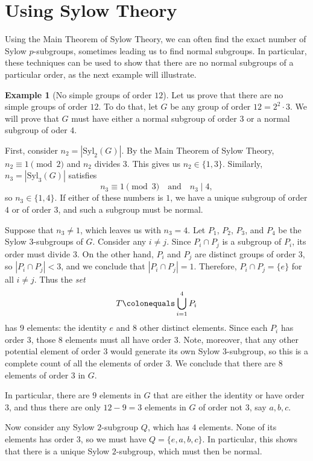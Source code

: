 \documentclass[12pt]{report}
\numberwithin{equation}{section}
\numberwithin{theorem}{chapter}
\theoremstyle{definition}
\newtheorem{example}[theorem]{Example}
\newtheorem*{basic properties}{Basic Properties}
\newtheorem*{Important Remark}{Important Remark}
\begin{document}
\section{Using Sylow Theory}


Using the Main Theorem of Sylow Theory, we can often find the exact number of Sylow $p$-subgroups, sometimes leading us to find normal subgroups. In particular, these techniques can be used to show that there are no normal subgroups of a particular order, as the next example will illustrate.


\begin{example}[No simple groups of order $12$]\label{example sylow 12}
Let us prove that there are no simple groups of order $12$. To do that, let $G$ be any group of order $12 = 2^2 \cdot 3$. We will prove that $G$ must have either a normal subgroup of order $3$ or a normal subgroup of oder $4$.


First, consider $n_2=|\mathrm{Syl}_2(G)|$. By the Main Theorem of Sylow Theory, $n_2 \equiv 1 \!\pmod 2$ and $n_2$ divides $3$. This gives us $n_2 \in \{ 1, 3 \}$. Similarly, $n_3 = |\mathrm{Syl}_3(G)|$ satisfies
$$n_3 \equiv 1 \!\!\pmod 3 \quad \textrm{and} \quad n_3 \mid 4,$$
so $n_3 \in \{1, 4 \}$.
If either of these numbers is $1$, we have a unique subgroup of order $4$ or of order $3$, and such a subgroup must be normal. 

Suppose that $n_3 \neq 1$, which leaves us with $n_3 = 4$. Let $P_1$, $P_2$, $P_3$, and $P_4$ be the Sylow $3$-subgroups of $G$. Consider any $i \neq j$. Since $P_i \cap P_j$ is a subgroup of $P_i$, its order must divide $3$. On the other hand, $P_i$ and $P_j$ are distinct groups of order $3$, so $|P_i \cap P_j| < 3$, and we conclude that  $|P_i \cap P_j| = 1$. Therefore, $P_i \cap P_j = \{e\}$ for all $i \neq j$. Thus the {\em set} 
$$T \colonequals \bigcup_{i=1}^4 P_i$$ 
has $9$ elements: the identity $e$ and $8$ other distinct elements. Since each $P_i$ has order $3$, those $8$ elements must all have order $3$. Note, moreover, that any other potential element of order $3$ would generate its own Sylow $3$-subgroup, so this is a complete count of all the elements of order $3$. We conclude that there are $8$ elements of order $3$ in $G$.

In particular, there are $9$ elements in $G$ that are either the identity or have order $3$, and thus there are only $12-9=3$ elements in $G$ of order not $3$, say $a, b, c$.

Now consider any Sylow $2$-subgroup $Q$, which has $4$ elements. None of its elements has order $3$, so we must have $Q = \{ e, a, b, c \}$. In particular, this shows that there is a unique Sylow $2$-subgroup, which must then be normal.
\end{example}
\end{document}

